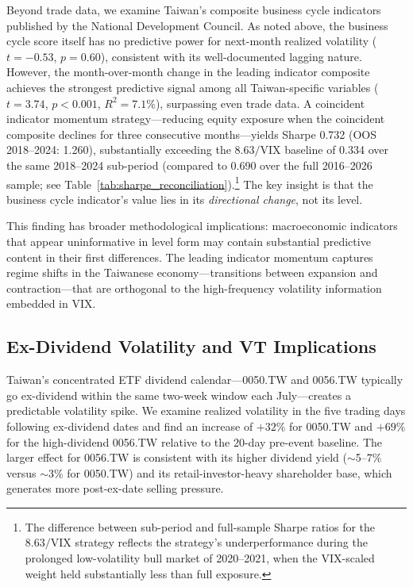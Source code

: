 Beyond trade data, we examine Taiwan's composite business cycle indicators published by the National Development Council. As noted above, the business cycle score itself has no predictive power for next-month realized volatility ($t = -0.53$, $p = 0.60$), consistent with its well-documented lagging nature. However, the month-over-month change in the leading indicator composite achieves the strongest predictive signal among all Taiwan-specific variables ($t = 3.74$, $p < 0.001$, $R^2 = 7.1\%$), surpassing even trade data. A coincident indicator momentum strategy---reducing equity exposure when the coincident composite declines for three consecutive months---yields Sharpe 0.732 (OOS 2018--2024: 1.260), substantially exceeding the $8.63/\text{VIX}$ baseline of 0.334 over the same 2018--2024 sub-period (compared to 0.690 over the full 2016--2026 sample; see Table~\ref{tab:sharpe_reconciliation}).\footnote{The difference between sub-period and full-sample Sharpe ratios for the $8.63/\text{VIX}$ strategy reflects the strategy's underperformance during the prolonged low-volatility bull market of 2020--2021, when the VIX-scaled weight held substantially less than full exposure.} The key insight is that the business cycle indicator's value lies in its \textit{directional change}, not its level.

This finding has broader methodological implications: macroeconomic indicators that appear uninformative in level form may contain substantial predictive content in their first differences. The leading indicator momentum captures regime shifts in the Taiwanese economy---transitions between expansion and contraction---that are orthogonal to the high-frequency volatility information embedded in VIX.

\subsection{Ex-Dividend Volatility and VT Implications}
\label{sec:exdiv}

Taiwan's concentrated ETF dividend calendar---0050.TW and 0056.TW typically go ex-dividend within the same two-week window each July---creates a predictable volatility spike. We examine realized volatility in the five trading days following ex-dividend dates and find an increase of $+32\%$ for 0050.TW and $+69\%$ for the high-dividend 0056.TW relative to the 20-day pre-event baseline. The larger effect for 0056.TW is consistent with its higher dividend yield ($\sim$5--7\% versus $\sim$3\% for 0050.TW) and its retail-investor-heavy shareholder base, which generates more post-ex-date selling pressure.

